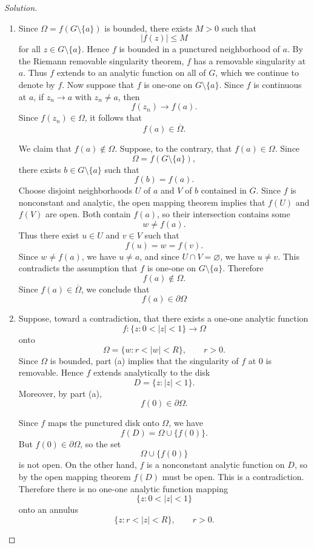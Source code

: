 \documentclass[12pt, a4paper]{report}
\theoremstyle{spaced}
\begin{document}
\begin{proof}[Solution]
	\begin{enumerate}[label=(\alph*)]

		\item Since $\Omega=f(G\setminus\{a\})$ is bounded, there exists $M>0$ such that
		      \[
			      |f(z)|\le M
		      \]
		      for all $z\in G\setminus\{a\}$. Hence $f$ is bounded in a punctured neighborhood of $a$. By the Riemann removable singularity theorem, $f$ has a removable singularity at $a$. Thus $f$ extends to an analytic function on all of $G$, which we continue to denote by $f$.
		      Now suppose that $f$ is one-one on $G\setminus\{a\}$. Since $f$ is continuous at $a$, if $z_n\to a$ with $z_n\neq a$, then
		      \[
			      f(z_n)\to f(a).
		      \]
		      Since $f(z_n)\in\Omega$, it follows that
		      \[
			      f(a)\in\overline{\Omega}.
		      \]

		      We claim that $f(a)\notin\Omega$. Suppose, to the contrary, that $f(a)\in\Omega$. Since
		      \[
			      \Omega=f(G\setminus\{a\}),
		      \]
		      there exists $b\in G\setminus\{a\}$ such that
		      \[
			      f(b)=f(a).
		      \]
		      Choose disjoint neighborhoods $U$ of $a$ and $V$ of $b$ contained in $G$. Since $f$ is nonconstant and analytic, the open mapping theorem implies that $f(U)$ and $f(V)$ are open. Both contain $f(a)$, so their intersection contains some
		      \[
			      w\neq f(a).
		      \]
		      Thus there exist $u\in U$ and $v\in V$ such that
		      \[
			      f(u)=w=f(v).
		      \]
		      Since $w\neq f(a)$, we have $u\neq a$, and since $U\cap V=\varnothing$, we have $u\neq v$. This contradicts the assumption that $f$ is one-one on $G\setminus\{a\}$.
		      Therefore
		      \[
			      f(a)\notin\Omega.
		      \]
		      Since $f(a)\in\overline{\Omega}$, we conclude that
		      \[
			      f(a)\in\partial\Omega
		      \]

		\item Suppose, toward a contradiction, that there exists a one-one analytic function
		      \[
			      f:\{z:0<|z|<1\}\longrightarrow \Omega
		      \]
		      onto
		      \[
			      \Omega=\{w:r<|w|<R\},
			      \qquad r>0.
		      \]
		      Since $\Omega$ is bounded, part (a) implies that the singularity of $f$ at $0$ is removable. Hence $f$ extends analytically to the disk
		      \[
			      D=\{z:|z|<1\}.
		      \]
		      Moreover, by part (a),
		      \[
			      f(0)\in\partial\Omega.
		      \]

		      Since $f$ maps the punctured disk onto $\Omega$, we have
		      \[
			      f(D)=\Omega\cup\{f(0)\}.
		      \]
		      But $f(0)\in\partial\Omega$, so the set
		      \[
			      \Omega\cup\{f(0)\}
		      \]
		      is not open. On the other hand, $f$ is a nonconstant analytic function on $D$, so by the open mapping theorem $f(D)$ must be open. This is a contradiction.
		      Therefore there is no one-one analytic function mapping
		      \[
			      \{z:0<|z|<1\}
		      \]
		      onto an annulus
		      \[
			      \{z:r<|z|<R\},
			      \qquad r>0.
		      \]
	\end{enumerate}
\end{proof}
\end{document}

